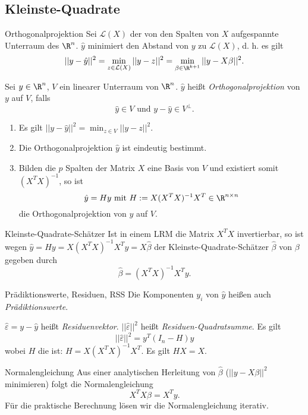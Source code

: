\subsection{Kleinste-Quadrate}

\begin{karte}{Orthogonalprojektion}
Sei \(\mathcal{L}(X)\) der von den Spalten von \(X\) aufgespannte Unterraum des \(\R^n\).
\(\hat{y}\) minimiert den Abstand von \(y\) zu \(\mathcal{L}(X)\), d. h. es gilt 
\[ || y - \hat{y} ||^2 = \min_{z \in \mathcal{L}(X)} || y - z||^2 = \min_{\beta \in \R^{k+1}} ||y-X\beta||^2. \]

Sei \(y\in \R^n\), \(V \) ein linearer Unterraum von \(\R^n\). \(\hat{y}\) heißt \textit{Orthogonalprojektion} von 
\(y\) auf \(V\), falls 
\[ \hat{y} \in V \text{ und } y - \hat{y} \in V^\bot. \]
\begin{enumerate}
    \item Es gilt \(||y - \hat{y}||^2 = \min_{z\in V} ||y-z||^2\).
    \item Die Orthogonalprojektion \(\hat{y}\) ist eindeutig bestimmt.
    \item Bilden die \(p\) Spalten der Matrix \(X\) eine Basis von \(V\) und existiert 
    somit \((X^T X)^{-1}\), so ist 
    \[ \hat{y} = Hy \text{ mit } H := X (X^T X)^{-1} X^T \in \R^{n\times n} \]
    die Orthogonalprojektion von \(y\) auf \(V\).
\end{enumerate}
\end{karte}

\begin{karte}{Kleinste-Quadrate-Schätzer}
Ist in einem LRM die Matrix \(X^T X\) invertierbar, so ist wegen \(\hat{y} = Hy = X (X^T X)^{-1} X^T y = X\hat{\beta}\) 
der Kleinste-Quadrate-Schätzer \(\hat{\beta}\) von \(\beta\) gegeben durch 
\[ \hat{\beta} = (X^T X)^{-1} X^T y. \]
\end{karte}

\begin{karte}{Prädiktionswerte, Residuen, RSS}
Die Komponenten \(y_i\) von \(\hat{y}\) heißen auch \textit{Prädiktionswerte}. 

\(\hat{\varepsilon} = y - \hat{y}\) heißt \textit{Residuenvektor}. 
\(||\hat{\varepsilon}||^2\) heißt \textit{Residuen-Quadratsumme}. Es gilt 
\[ ||\hat{\varepsilon}||^2 = y^T (I_n - H)y \]
wobei \(H\) die  ist: \(H = X (X^T X)^{-1} X^T\). Es gilt \(HX = X\).
\end{karte}

\begin{karte}{Normalengleichung}
Aus einer analytischen Herleitung von \(\hat{\beta}\) (\(||y - X\beta||^2\) minimieren)
folgt die Normalengleichung 
\[ X^T X \beta = X^T y. \]
Für die praktische Berechnung lösen wir die Normalengleichung iterativ.
\end{karte}

